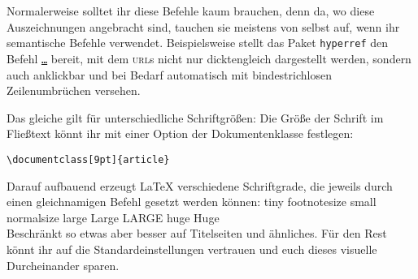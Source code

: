 Normalerweise solltet ihr diese Befehle kaum brauchen, denn da, wo diese Auszeichnungen angebracht sind, tauchen sie meistens von selbst auf, wenn ihr semantische Befehle verwendet.
Beispielsweise stellt das Paket \texttt{hyperref} den Befehl \texttt{\url{…}} bereit, mit dem \textsc{url}s nicht nur dicktengleich dargestellt werden, sondern auch anklickbar und bei Bedarf automatisch mit bindestrichlosen Zeilenumbrüchen versehen.

Das gleiche gilt für unterschiedliche Schriftgrößen: 
Die Größe der Schrift im Fließtext könnt ihr mit einer Option der Dokumentenklasse festlegen: 
\begin{verbatim}
\documentclass[9pt]{article}
\end{verbatim}
Darauf aufbauend erzeugt \LaTeX{} verschiedene Schriftgrade, die jeweils durch einen gleichnamigen Befehl gesetzt werden können:
\tiny tiny \footnotesize footnotesize \small small \normalsize normalsize \large large \Large Large \LARGE LARGE \huge huge \Huge Huge \normalsize \\
Beschränkt so etwas aber besser auf Titelseiten und ähnliches.
Für den Rest könnt ihr auf die Standardeinstellungen vertrauen und euch dieses visuelle Durcheinander sparen.


